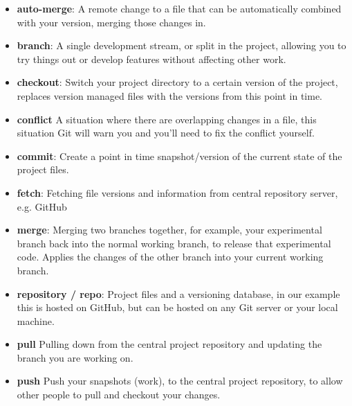 \begin{itemize}[leftmargin=*]
	\item
	\textbf{auto-merge}:
		A remote change to a file that can be automatically combined with your version, merging those changes in.
	\item
		\textbf{branch}:
		A single development stream, or split in the project, allowing you to try things out or develop features without affecting other work.
	\item
		\textbf{checkout}:
		Switch your project directory to a certain version of the project, replaces version managed files with the versions from this point in time.
	\item
		\textbf{conflict}
		A situation where there are overlapping changes in a file, this situation Git will warn you and you’ll need to fix the conflict yourself.
	\item
		\textbf{commit}:
		Create a point in time snapshot/version of the current state of the project files.
	\item
        \textbf{fetch}:
		Fetching file versions and information from central repository server, e.g. GitHub
	\item
		\textbf{merge}:
		Merging two branches together, for example, your experimental branch back into the normal working branch, to release that experimental code. Applies the changes of the other branch into your current working branch.
    \item
        \textbf{repository / repo}:
        Project files and a versioning database, in our example this is hosted on GitHub, but can be hosted on any Git server or your local machine.
    \item
    	\textbf{pull}
    	Pulling down from the central project repository and updating the branch you are working on.
    \item
    	\textbf{push}
    	Push your snapshots (work), to the central project repository, to allow other people to pull and checkout your changes.
\end{itemize}
